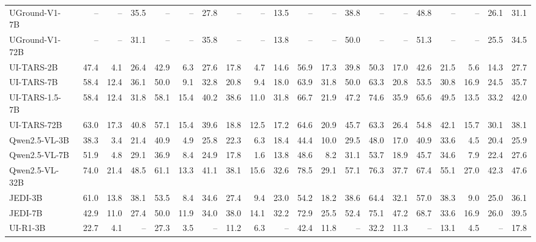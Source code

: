 \begin{table}[t]
{\begin{tabular}{@{}l rrr rrr rrr rrr rrr rrr r @{}}
       UGround-V1-7B~\citeyearpar{gou2024navigating} & -- & -- & 35.5 & -- & -- & 27.8 & -- & -- & 13.5 & -- & -- & 38.8 & -- & -- & 48.8 & -- & -- & 26.1 & 31.1 \\
       UGround-V1-72B~\citeyearpar{gou2024navigating} & -- & -- & 31.1 & -- & -- & 35.8 & -- & -- & 13.8 & -- & -- & 50.0 & -- & -- & 51.3 & -- & -- & 25.5 & 34.5 \\
       UI-TARS-2B~\citeyearpar{qin2025uitars} & 47.4 & 4.1 & 26.4 & 42.9 & 6.3 & 27.6 & 17.8 & 4.7 & 14.6 & 56.9 & 17.3 & 39.8 & 50.3 & 17.0 & 42.6 & 21.5 & 5.6 & 14.3 & 27.7 \\
       UI-TARS-7B~\citeyearpar{qin2025uitars} & 58.4 & 12.4& 36.1 & 50.0 & 9.1 & 32.8 & 20.8 & 9.4 & 18.0 & 63.9 & 31.8 & 50.0 & 63.3 & 20.8 & 53.5 & 30.8 & 16.9 & 24.5 & 35.7 \\
       UI-TARS-1.5-7B~\citeyearpar{qin2025uitars} & 58.4 & 12.4 & 31.8 & 58.1 & 15.4 & 40.2 & 38.6 & 11.0 & 31.8 & 66.7 & 21.9 & 47.2 & 74.6 & 35.9 & 65.6 & 49.5 & 13.5 & 33.2 & 42.0 \\
       UI-TARS-72B~\citeyearpar{qin2025uitars} & 63.0 & 17.3 & 40.8 & 57.1 & 15.4 & 39.6 & 18.8 & 12.5 & 17.2 & 64.6 & 20.9 & 45.7 & 63.3 & 26.4 & 54.8 & 42.1 & 15.7 & 30.1 & 38.1 \\
       Qwen2.5-VL-3B~\citeyearpar{bai2025qwen25vl} & 38.3 & 3.4 & 21.4 & 40.9 & 4.9 & 25.8 & 22.3 & 6.3 & 18.4 & 44.4 & 10.0 & 29.5 & 48.0 & 17.0 & 40.9 & 33.6 & 4.5 & 20.4 & 25.9 \\
       Qwen2.5-VL-7B~\citeyearpar{bai2025qwen25vl} & 51.9 & 4.8 & 29.1 & 36.9 & 8.4 & 24.9 & 17.8 & 1.6 & 13.8 & 48.6 & 8.2 & 31.1 & 53.7 & 18.9 & 45.7 & 34.6 & 7.9 & 22.4 & 27.6 \\
       Qwen2.5-VL-32B~\citeyearpar{bai2025qwen25vl} & 74.0 & 21.4 & 48.5 & 61.1 & 13.3 & 41.1 & 38.1 & 15.6 & 32.6 & 78.5 & 29.1 & 57.1 & 76.3 & 37.7 & 67.4 & 55.1 & 27.0 & 42.3 & 47.6 \\
       JEDI-3B~\citeyearpar{xie2025scalingcomputerusegroundinguser} & 61.0 & 13.8 & 38.1 & 53.5 & 8.4 & 34.6 & 27.4 & 9.4 & 23.0 & 54.2 & 18.2 & 38.6 & 64.4 & 32.1 & 57.0 & 38.3 & 9.0 & 25.0 & 36.1 \\
       JEDI-7B~\citeyearpar{xie2025scalingcomputerusegroundinguser} & 42.9 & 11.0 & 27.4 & 50.0 & 11.9 & 34.0 & 38.0 & 14.1 & 32.2 & 72.9 & 25.5 & 52.4 & 75.1 & 47.2 & 68.7 & 33.6 & 16.9 & 26.0 & 39.5 \\
       UI-R1-3B~\citeyearpar{lu2025ui} & 22.7 & 4.1 & -- & 27.3 & 3.5 & -- & 11.2 & 6.3 & -- & 42.4 & 11.8 & -- & 32.2 & 11.3 & -- & 13.1 & 4.5 & -- & 17.8 \\

\end{tabular}}
\end{table}

